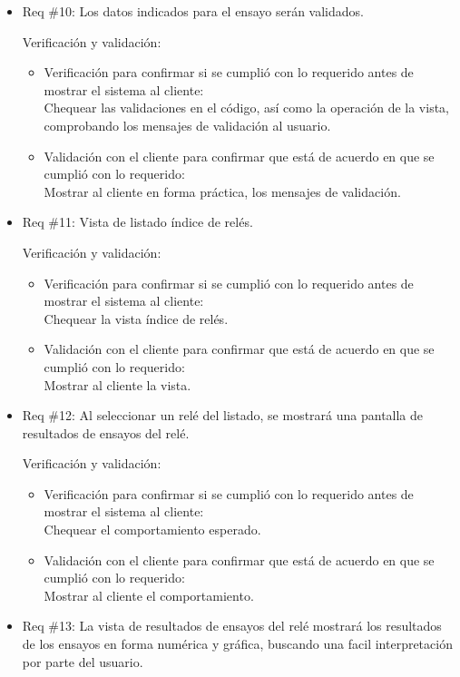 \documentclass[11pt]{charter}
\begin{document}
\begin{itemize}
\item Req \#10: Los datos indicados para el ensayo serán validados.

Verificación y validación:

\begin{itemize}
\item Verificación para confirmar si se cumplió con lo requerido antes de mostrar el sistema al cliente:\\
Chequear las validaciones en el código, así como la operación de la vista, comprobando los mensajes de validación al usuario.
\item Validación con el cliente para confirmar que está de acuerdo en que se cumplió con lo requerido:\\
Mostrar al cliente en forma práctica, los mensajes de validación.
\end{itemize}

\item Req \#11: Vista de listado índice de relés.

Verificación y validación:

\begin{itemize}
\item Verificación para confirmar si se cumplió con lo requerido antes de mostrar el sistema al cliente:\\
Chequear la vista índice de relés.
\item Validación con el cliente para confirmar que está de acuerdo en que se cumplió con lo requerido:\\
Mostrar al cliente la vista.
\end{itemize}

\item Req \#12: Al seleccionar un relé del listado, se mostrará una pantalla de resultados de ensayos del relé.

Verificación y validación:

\begin{itemize}
\item Verificación para confirmar si se cumplió con lo requerido antes de mostrar el sistema al cliente:\\
Chequear el comportamiento esperado.
\item Validación con el cliente para confirmar que está de acuerdo en que se cumplió con lo requerido:\\
Mostrar al cliente el comportamiento.
\end{itemize}

\item Req \#13: La vista de resultados de ensayos del relé mostrará los resultados de los ensayos en forma numérica y gráfica, buscando una facil interpretación por parte del usuario.


\end{itemize}
\end{document}
